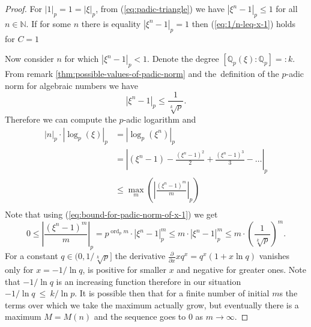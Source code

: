 \documentclass[10pt,a4paper]{amsart}
\def\N{{\mathbb N}}
\def\Q{{\mathbb Q}}
\def\ln{\operatorname{ln}}
\def\ord{\operatorname{ord}}
\begin{document}
\begin{proof}
  For $|1|_p = 1 = |\xi|_p$, from (\ref{eq:padic-triangle}) we have $|\xi^n-1|_p \leq 1$ for all $n \in \N$.
  If for some $n$ there is equality $|\xi^n-1|_p = 1$ then (\ref{eq:1/n-leq-x-1}) holds for $C=1$

  Now consider $n$ for which $|\xi^n-1|_p < 1$.
  Denote the degree $\left[ \Q_p(\xi) : \Q_p \right] =: k$.
  From remark \ref{thm:possible-values-of-padic-norm} and
  the~definition of the $p$-adic norm for algebraic numbers we have
  \begin{equation}\label{eq:bound-for-padic-norm-of-x-1}
      |\xi^n-1|_p \leq \frac{1}{\sqrt[k]{p}}.
  \end{equation}
  Therefore we can compute the $p$-adic logarithm and
  \begin{align*}
    |n|_p \cdot |\log_p (\xi)|_p &= |\log_p (\xi^n)|_p \\
    &= \left|(\xi^n - 1) - \frac{(\xi^n - 1)^2}{2} + \frac{(\xi^n - 1)^3}{3} - \dots \right|_p \\
    &\leq \max_m \left( \left|\frac{(\xi^n - 1)^m}{m} \right|_p \right) \\
  \end{align*}
  Note that using (\ref{eq:bound-for-padic-norm-of-x-1}) we get
  \begin{equation}\label{eq:padic-maximum-term}
    0 \leq \left| \frac{(\xi^n - 1)^m}{m} \right|_p
    = p^{\ord_p m} \cdot \left| \xi^n - 1 \right|_p^m
    \leq m \cdot \left| \xi^n - 1 \right|_p^m
    \leq m \cdot \left( \frac{1}{\sqrt[k]{p}} \right)^m.
  \end{equation}
  For a constant $q \in (0, 1/\sqrt[k]{p}]$ the derivative
  $\frac{\partial}{\partial x} xq^x = q^x(1+x\ln q)$ vanishes only for
  $x = -1/\ln q$, is positive for smaller $x$ and negative for greater ones.
  Note that $-1/\ln q$ is an increasing function therefore in our situation $-1/\ln q \ \leq \ k/\ln p$.
  It is possible then that for a finite number of initial $m$s the terms over which we take the maximum
  actually grow, but eventually there is a maximum $M = M(n)$ and the sequence goes to $0$ as $m \to \infty$.


\end{proof}
\end{document}
